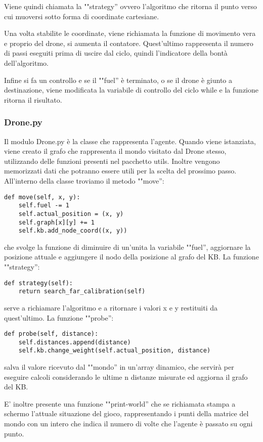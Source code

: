 Viene quindi chiamata la ""strategy'' ovvero l'algoritmo che ritorna il punto verso cui muoversi sotto forma di coordinate cartesiane. 

Una volta stabilite le coordinate, viene richiamata la funzione di movimento vera e proprio del drone, si aumenta il contatore. Quest'ultimo rappresenta il numero di passi eseguiti prima di uscire dal ciclo, quindi l'indicatore della bontà dell'algoritmo. 

Infine si fa un controllo e se il ""fuel'' è terminato, o se il drone è giunto a destinazione, viene modificata la variabile di controllo del ciclo while e la funzione ritorna il risultato.

\subsubsection{Drone.py}
Il modulo Drone.py è la classe che rappresenta l'agente. Quando viene istanziata, viene creato il grafo che rappresenta il mondo visitato dal Drone stesso, utilizzando delle funzioni presenti nel pacchetto utils. Inoltre vengono memorizzati dati che potranno essere utili per la scelta del prossimo passo. 
All'interno della classe troviamo il metodo ""move'':
\begin{verbatim}
def move(self, x, y):
    self.fuel -= 1
    self.actual_position = (x, y)
    self.graph[x][y] += 1
    self.kb.add_node_coord((x, y))
\end{verbatim}
che svolge la funzione di diminuire di un'unita la variabile ""fuel'', aggiornare la posizione attuale e aggiungere il nodo della posizione al grafo del KB. 
La funzione ""strategy'':
\begin{verbatim}
def strategy(self):
    return search_far_calibration(self)
\end{verbatim}
serve a richiamare l'algoritmo e a ritornare i valori x e y restituiti da quest'ultimo. 
La funzione ""probe'':
\begin{verbatim}
def probe(self, distance):
    self.distances.append(distance)
    self.kb.change_weight(self.actual_position, distance)
\end{verbatim}
salva il valore ricevuto dal ""mondo'' in un'array dinamico, che servirà per eseguire calcoli considerando le ultime n distanze misurate ed aggiorna il grafo del KB. 

E' inoltre presente una funzione ""print-world'' che se richiamata stampa a schermo l'attuale situazione del gioco, rappresentando i punti della matrice del mondo con un intero che indica il numero di volte che l'agente è passato su ogni punto.

